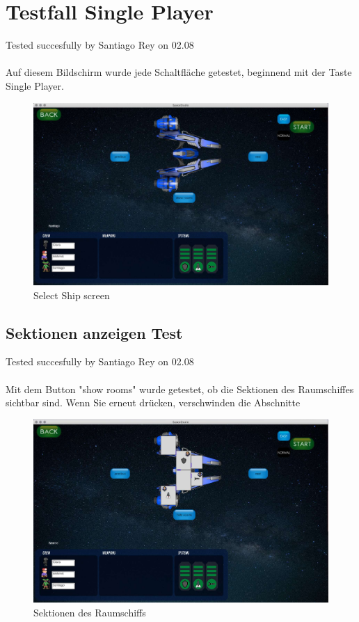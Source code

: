 \documentclass[12pt]{article}
\begin{document}
\section{Testfall Single Player}
Tested succesfully by Santiago Rey on 02.08\\\\
Auf diesem Bildschirm wurde jede Schaltfläche getestet, beginnend mit der Taste Single Player.\\
\begin{figure}[h]
\centering
\includegraphics[scale=0.4]{TestProtocolBilder/selecShipScreen.jpg}
\caption{Select Ship screen}
\end{figure}
\newpage
\subsection{Sektionen anzeigen Test}
Tested succesfully by Santiago Rey on 02.08\\\\
Mit dem Button "show rooms" wurde getestet, ob die Sektionen des Raumschiffes sichtbar sind. Wenn Sie erneut drücken, verschwinden die Abschnitte\\
\begin{figure}
\centering
\includegraphics[scale=0.4]{TestProtocolBilder/shipRooms.jpg}
\caption{Sektionen des Raumschiffs}
\end{figure}
\end{document}
